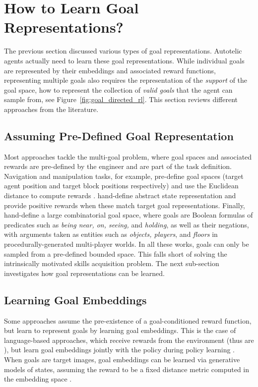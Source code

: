 \section{How to Learn Goal Representations?}
\label{sec:survey_learning_goal_rep}

The previous section discussed various types of goal representations. Autotelic agents actually need to learn these goal representations. While individual goals are represented by their embeddings and associated reward functions, representing multiple goals also requires the representation of the \textit{support} of the goal space, \ie how to represent the collection of \textit{valid goals} that the agent can sample from, see Figure~\ref{fig:goal_directed_rl}. This section reviews different approaches from the literature.

\subsection{Assuming Pre-Defined Goal Representation}
Most approaches tackle the multi-goal \rl problem, where goal spaces and associated rewards are pre-defined by the engineer and are part of the task definition. Navigation and manipulation tasks, for example, pre-define goal spaces (\eg target agent position and target block positions respectively) and use the Euclidean distance to compute rewards \cite{schaul2015universal,andrychowicz2017hindsight,nair2017overcoming,plappert2018multi,goalgan,curious,blaes2019control,lanier2019curiosity,ding_imitation_2019,li2019towards}. \cite{akakzia2020decstr,ecoffet2020first} hand-define abstract state representation and provide positive rewards when these match target goal representations. Finally, \cite{team2021open} hand-define a large combinatorial goal space, where goals are Boolean formulas of predicates such as \textit{being near, on, seeing,} and \textit{holding}, as well as their negations, with arguments taken as entities such as \textit{objects, players}, and \textit{floors} in procedurally-generated multi-player worlds.
In all these works, goals can only be sampled from a pre-defined bounded space. This falls short of solving the intrinsically motivated skills acquisition problem. The next sub-section investigates how goal representations can be learned.

\subsection{Learning Goal Embeddings}
Some approaches assume the pre-existence of a goal-conditioned reward function, but learn to represent goals by learning goal embeddings. This is the case of language-based approaches, which receive rewards from the environment (thus are \rlemgep), but learn goal embeddings jointly with the policy during policy learning \cite{Hermann2017,chan2019actrce,Jiang2019,bahdanau2018systematic,hill2019emergent,ther,lynch2020grounding}. When goals are target images, goal embeddings can be learned via generative models of states, assuming the reward to be a fixed distance metric computed in the embedding space \cite{nair2018visual,florensa2019selfsupervised,pong2019skew,nair2020contextual}.

